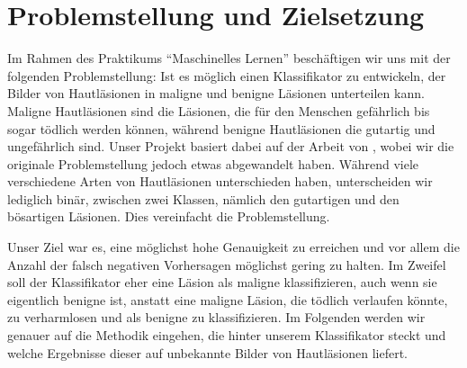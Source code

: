 \section{Problemstellung und Zielsetzung}

Im Rahmen des Praktikums ``Maschinelles Lernen'' beschäftigen wir uns mit der folgenden Problemstellung: Ist es möglich einen Klassifikator zu entwickeln, der Bilder von Hautläsionen in maligne und benigne Läsionen unterteilen kann. Maligne Hautläsionen sind die Läsionen, die für den Menschen gefährlich bis sogar tödlich werden können, während benigne Hautläsionen die gutartig und ungefährlich sind. Unser Projekt basiert dabei auf der Arbeit von \citet{esteva2017dermatologist}, wobei wir die originale Problemstellung jedoch etwas abgewandelt haben. Während \citet{esteva2017dermatologist} viele verschiedene Arten von Hautläsionen unterschieden haben, unterscheiden wir lediglich binär, zwischen zwei Klassen, nämlich den gutartigen und den bösartigen Läsionen. Dies vereinfacht die Problemstellung.

Unser Ziel war es, eine möglichst hohe Genauigkeit zu erreichen und vor allem die Anzahl der falsch negativen Vorhersagen möglichst gering zu halten. Im Zweifel soll der Klassifikator eher eine Läsion als maligne klassifizieren, auch wenn sie eigentlich benigne ist, anstatt eine maligne Läsion, die tödlich verlaufen könnte, zu verharmlosen und als benigne zu klassifizieren. Im Folgenden werden wir genauer auf die Methodik eingehen, die hinter unserem Klassifikator steckt und welche Ergebnisse dieser auf unbekannte Bilder von Hautläsionen liefert. 